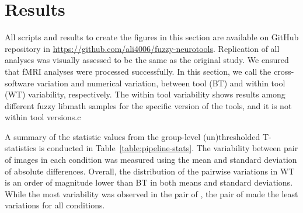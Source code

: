 \documentclass[conference]{IEEEtran}
\begin{document}


\section{Results}
All scripts and results to create the figures in this section are available on GitHub repository
in \url{https://github.com/ali4006/fuzzy-neurotools}.
Replication of all analyses was visually assessed to be the same as the original study.
We ensured that fMRI analyses were processed successfully.
In this section, we call the cross-software variation and numerical variation,
between tool (BT) and within tool (WT) variability, respectively. 
The within tool variability shows results among different fuzzy libmath
samples for the specific version of the tools, and it is not within tool versions.c

A summary of the statistic values from the group-level (un)thresholded T-statistics is conducted in
Table~\ref{table:pipeline-stats}.
The variability between pair of images in each condition was measured using the mean and standard deviation of absolute differences.
Overall, the distribution of the pairwise variations in WT is an order of magnitude lower than BT in both means and standard deviations.
While the most variability was observed in the pair of \fslafni, the pair of \fslspm made the least variations for all conditions.
\end{document}
